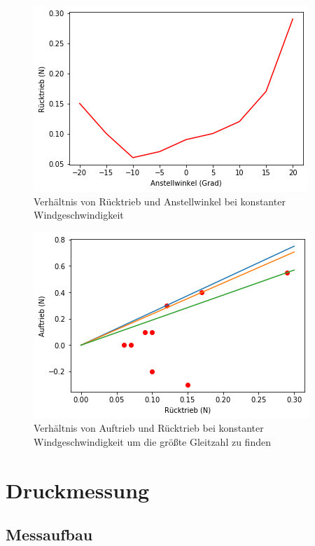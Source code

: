 \begin{figure}[h!]
    \centering
    \includegraphics[scale=0.8]{Aeromechanik/Protokoll/fig/Aeromechanik Versuch 3.12.png}
    \caption{Verhältnis von Rücktrieb und Anstellwinkel bei konstanter Windgeschwindigkeit}
    \label{fig:Aeromechanik Versuch 3.12}
\end{figure}

\begin{figure}[h!]
    \centering
    \includegraphics[scale=0.8]{Aeromechanik/Protokoll/fig/Aeromechanik Versuch 3.13.png}
    \caption{Verhältnis von Auftrieb und Rücktrieb bei konstanter Windgeschwindigkeit um die größte Gleitzahl zu finden}
    \label{fig:Aeromechanik Versuch 3.13}
\end{figure}

\section{Druckmessung}
\subsection{Messaufbau}